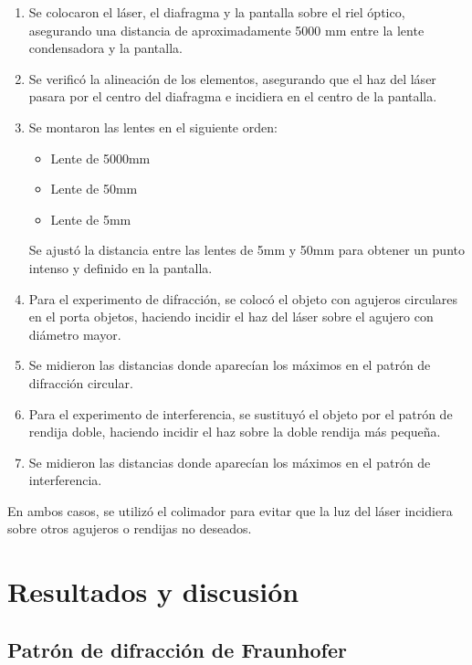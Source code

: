 \documentclass[twocolumn,a4paper,11pt]{scrartcl}
\begin{document}
\begin{enumerate}
    \item Se colocaron el láser, el diafragma y la pantalla sobre el riel óptico, asegurando una distancia de aproximadamente 5000 mm entre la lente condensadora y la pantalla.
    
    \item Se verificó la alineación de los elementos, asegurando que el haz del láser pasara por el centro del diafragma e incidiera en el centro de la pantalla.
    
    \item Se montaron las lentes en el siguiente orden:
    \begin{itemize}
        \item Lente de 5000mm
        \item Lente de 50mm
        \item Lente de 5mm
    \end{itemize}
    Se ajustó la distancia entre las lentes de 5mm y 50mm para obtener un punto intenso y definido en la pantalla.
    
    \item Para el experimento de difracción, se colocó el objeto con agujeros circulares en el porta objetos, haciendo incidir el haz del láser sobre el agujero con diámetro mayor.
    
    \item Se midieron las distancias donde aparecían los máximos en el patrón de difracción circular.
    
    \item Para el experimento de interferencia, se sustituyó el objeto por el patrón de rendija doble, haciendo incidir el haz sobre la doble rendija más pequeña.
    
    \item Se midieron las distancias donde aparecían los máximos en el patrón de interferencia.
\end{enumerate}

En ambos casos, se utilizó el colimador para evitar que la luz del láser incidiera sobre otros agujeros o rendijas no deseados.

\section{Resultados y discusión}

\subsection{Patrón de difracción de Fraunhofer}
\end{document}
